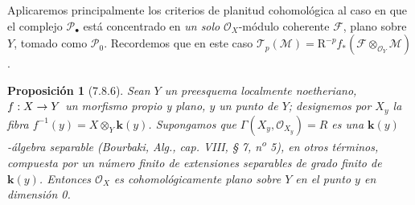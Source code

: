 \documentclass[10pt,oneside,openany]{book}
\theoremstyle{egaenv}\newtheorem*{env}{---}
\theoremstyle{egastatement}
\newtheorem*{proposition}{Proposición}
\theoremstyle{egadescription}
\renewcommand{\to}{\mathchoice{\longrightarrow}{\rightarrow}{\rightarrow}{\rightarrow}}
\begin{document}
Aplicaremos principalmente los criterios de planitud cohomológica al
caso en que el complejo $\mathscr P_\bullet$ está concentrado en \emph{un solo} $\mathscr O_X$-módulo coherente $\mathscr F$, plano
sobre $Y$, tomado como $\mathscr P_0$. Recordemos que en este caso
$\mathscr T_p(\mathscr M)=\mathrm R^{-p}f_*
(\mathscr F\otimes_{\mathscr O_Y}\mathscr M)$.

\begin{proposition}[7.8.6]
Sean $Y$ un preesquema localmente noetheriano, $f:X\to Y$ un morfismo propio
y plano, $y$ un punto de $Y$; designemos por $X_y$ la fibra
$f^{-1}(y)=X\otimes_Y\boldsymbol{k}(y)$. Supongamos que
$\Gamma(X_y,\mathscr O_{X_y})=R$ es una $\boldsymbol{k}(y)$-álgebra separable
\textup{(Bourbaki, \emph{Alg.}, cap. VIII, § 7, n\textsuperscript{o} 5)}, en otros términos,
compuesta por un número finito de extensiones separables de grado finito de $\boldsymbol{k}(y)$.
Entonces $\mathscr O_X$ es cohomológicamente plano sobre $Y$ en el punto $y$ en
dimensión 0.
\end{proposition}
\end{document}
